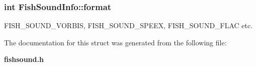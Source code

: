 \subsubsection[{format}]{\setlength{\rightskip}{0pt plus 5cm}int {\bf \-Fish\-Sound\-Info\-::format}}\label{structFishSoundInfo_a3fd250e7150ce5eb58737f715264e913}


\-F\-I\-S\-H\-\_\-\-S\-O\-U\-N\-D\-\_\-\-V\-O\-R\-B\-I\-S, \-F\-I\-S\-H\-\_\-\-S\-O\-U\-N\-D\-\_\-\-S\-P\-E\-E\-X, \-F\-I\-S\-H\-\_\-\-S\-O\-U\-N\-D\-\_\-\-F\-L\-A\-C etc. 



\-The documentation for this struct was generated from the following file\-:\begin{DoxyCompactItemize}
\item 
{\bf fishsound.\-h}\end{DoxyCompactItemize}
